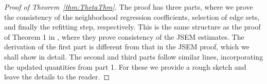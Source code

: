 \documentclass[12pt, letterpaper]{article}
\numberwithin{equation}{section}
\begin{document}
\begin{proof}[Proof of Theorem~\ref{thm:ThetaThm}]
The proof has three parts, where we prove the consistency of the neighborhood regression coefficients, selection of edge sets, and finally the refitting step, respectively. This is the same structure as the proof of Theorem 1 in \cite{MaMichailidis15}, where they prove consistency of the JSEM estimates. The derivation of the first part is different from that in the JSEM proof, which we shall show in detail. The second and third parts follow similar lines, incorporating the updated quantities from part 1. For these we provide a rough sketch and leave the details to the reader.

%
%
%

\end{proof}
\end{document}
